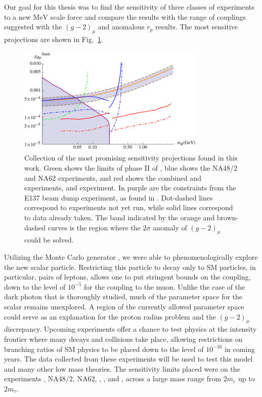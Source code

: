 \label{chapter:conclusion}

Our goal for this thesis was to find the sensitivity of three classes of experiments to a new $\textrm{MeV}$ scale force and compare the results with the range of couplings suggested with the $(g-2)_\mu$ and anomalous $r_p$ results.
The most sensitive projections are shown in Fig.~\ref{fig:best_limits}.

\begin{figure}[h]
    \centering
    \includegraphics[width=0.8\textwidth]{Figures/limits/best_limits}
    \caption[Collection of the most promising sensitivity projections found in this work.]{Collection of the most promising sensitivity projections found in this work. Green shows the limits of phase II of \mueee, blue shows the NA48/2 and NA62 experiments, and red shows the combined \belle and \babar experiments, and \belletwo experiment. In purple are the constraints from the E137 beam dump experiment, as found in \cite{Batell:2015unpub}. Dot-dashed lines correspond to experiments not yet run, while solid lines correspond to data already taken. The band indicated by the orange and brown-dashed curves is the region where the $2\sigma$ anomaly of $(g-2)_\mu$ could be solved.} 
    \label{fig:best_limits}
\end{figure}

Utilizing the Monte Carlo generator \madgraph, we were able to phenomenologically explore the new scalar particle.
Restricting this particle to decay only to SM particles, in particular, pairs of leptons, allows one to put stringent bounds on the coupling, down to the level of $10^{-5}$ for the coupling to the muon.
Unlike the case of the dark photon that is thoroughly studied, much of the parameter space for the scalar remains unexplored.
A region of the currently allowed parameter space could serve as an explanation for the proton radius problem and the $(g-2)_\mu$ discrepancy.
Upcoming experiments offer a chance to test physics at the intensity frontier where many decays and collisions take place, allowing restrictions on branching ratios of SM physics to be placed down to the level of $10^{-16}$ in coming years.
The data collected from these experiments will be used to test this model and many other low mass theories.
The sensitivity limits placed were on the experiments \mueee, NA48/2, NA62, \babar, \belle, and \belletwo, across a large mass range from $2m_e$ up to $2m_\tau$.


